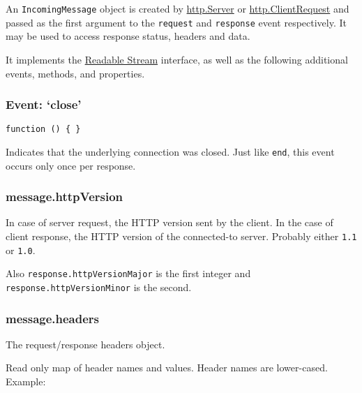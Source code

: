 An \texttt{IncomingMessage} object is created by
\hyperref[httpux5fclassux5fhttpux5fserver]{http.Server} or
\hyperref[httpux5fclassux5fhttpux5fclientrequest]{http.ClientRequest}
and passed as the first argument to the
\texttt{\textquotesingle{}request\textquotesingle{}} and
\texttt{\textquotesingle{}response\textquotesingle{}} event
respectively. It may be used to access response status, headers and
data.

It implements the
\href{stream.html\#stream_class_stream_readable}{Readable Stream}
interface, as well as the following additional events, methods, and
properties.

\subsubsection{\texorpdfstring{Event:
`close'}{Event: close}}\label{event-close-2}

\texttt{function\ ()\ \{\ \}}

Indicates that the underlying connection was closed. Just like
\texttt{\textquotesingle{}end\textquotesingle{}}, this event occurs only
once per response.

\subsubsection{message.httpVersion}\label{message.httpversion}

In case of server request, the HTTP version sent by the client. In the
case of client response, the HTTP version of the connected-to server.
Probably either \texttt{\textquotesingle{}1.1\textquotesingle{}} or
\texttt{\textquotesingle{}1.0\textquotesingle{}}.

Also \texttt{response.httpVersionMajor} is the first integer and
\texttt{response.httpVersionMinor} is the second.

\subsubsection{message.headers}\label{message.headers}

The request/response headers object.

Read only map of header names and values. Header names are lower-cased.
Example:

\begin{Shaded}
\begin{Highlighting}[]
\CommentTok{//}
\NormalTok{(}\NormalTok{);}
\end{Highlighting}
\end{Shaded}

